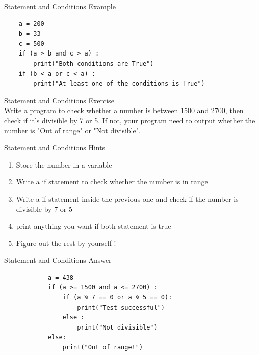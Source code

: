 \documentclass{beamer}
\begin{document}
    \begin{frame}[fragile]{Statement and Conditions}
        \color{blue} \Large Example \\
        \color{black} \normalsize \vskip 10pt
        \begin{verbatim}
    a = 200
    b = 33
    c = 500
    if (a > b and c > a) :
        print("Both conditions are True")
    if (b < a or c < a) :
        print("At least one of the conditions is True")
        \end{verbatim}  
    \end{frame}

    
    \begin{frame}{Statement and Conditions}
        \color{blue} \Large Exercise \\
        \color{black} \normalsize \vskip 5pt
        Write a program to check whether a number is between 1500 and 2700, then check 
        if it's divisible by 7 or 5. If not, your program need to output whether the 
        number is "Out of range" or "Not divisible".
    \end{frame}
    
    \begin{frame}{Statement and Conditions}
        \color{blue} \Large Hints \\
        \color{black} \normalsize \vskip 5pt
        \begin{enumerate}
            \item Store the number in a variable
            \item Write a if statement to check whether the number is in range
            \item Write a if statement inside the previous one and check if the number is divisible by 7 or 5
            \item print anything you want if both statement is true
            \item Figure out the rest by yourself !
        \end{enumerate}
    \end{frame}

    \begin{frame} [fragile] {Statement and Conditions}
        \color{blue} \Large Answer \\
        \color{black} \normalsize \vskip 10pt
        \begin{verbatim}
            a = 438
            if (a >= 1500 and a <= 2700) :
                if (a % 7 == 0 or a % 5 == 0):
                    print("Test successful")
                else :
                    print("Not divisible")
            else:
                print("Out of range!")
        \end{verbatim}
    \end{frame}
\end{document}
